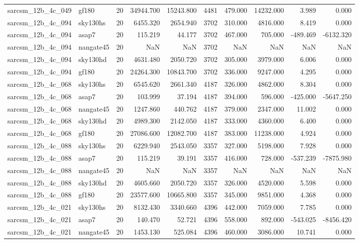\documentclass{article}
\begin{document}
\begin{longtable}{llrrrrrrrr}
sarcsm\_12b\_4c\_049 & gf180 & 20 & 34944.700 & 15243.800 & 4481 & 479.000 & 14232.000 & 3.989 & 0.000 \\
sarcsm\_12b\_4c\_094 & sky130hs & 20 & 6455.320 & 2654.940 & 3702 & 310.000 & 4816.000 & 8.419 & 0.000 \\
sarcsm\_12b\_4c\_094 & asap7 & 20 & 115.219 & 44.177 & 3702 & 467.000 & 705.000 & -489.469 & -6132.320 \\
sarcsm\_12b\_4c\_094 & nangate45 & 20 & NaN & NaN & 3702 & NaN & NaN & NaN & NaN \\
sarcsm\_12b\_4c\_094 & sky130hd & 20 & 4631.480 & 2050.720 & 3702 & 305.000 & 3979.000 & 6.006 & 0.000 \\
sarcsm\_12b\_4c\_094 & gf180 & 20 & 24264.300 & 10843.700 & 3702 & 336.000 & 9247.000 & 4.295 & 0.000 \\
sarcsm\_12b\_4c\_068 & sky130hs & 20 & 6545.620 & 2661.340 & 4187 & 326.000 & 4862.000 & 8.304 & 0.000 \\
sarcsm\_12b\_4c\_068 & asap7 & 20 & 103.999 & 37.194 & 4187 & 394.000 & 596.000 & -425.000 & -5647.250 \\
sarcsm\_12b\_4c\_068 & nangate45 & 20 & 1247.860 & 440.762 & 4187 & 379.000 & 2347.000 & 11.002 & 0.000 \\
sarcsm\_12b\_4c\_068 & sky130hd & 20 & 4989.300 & 2142.050 & 4187 & 333.000 & 4360.000 & 6.400 & 0.000 \\
sarcsm\_12b\_4c\_068 & gf180 & 20 & 27086.600 & 12082.700 & 4187 & 383.000 & 11238.000 & 4.924 & 0.000 \\
sarcsm\_12b\_4c\_088 & sky130hs & 20 & 6229.940 & 2543.050 & 3357 & 327.000 & 5198.000 & 7.928 & 0.000 \\
sarcsm\_12b\_4c\_088 & asap7 & 20 & 115.219 & 39.191 & 3357 & 416.000 & 728.000 & -537.239 & -7875.980 \\
sarcsm\_12b\_4c\_088 & nangate45 & 20 & NaN & NaN & 3357 & NaN & NaN & NaN & NaN \\
sarcsm\_12b\_4c\_088 & sky130hd & 20 & 4605.660 & 2050.720 & 3357 & 326.000 & 4520.000 & 5.598 & 0.000 \\
sarcsm\_12b\_4c\_088 & gf180 & 20 & 23577.600 & 10665.800 & 3357 & 345.000 & 9851.000 & 4.368 & 0.000 \\
sarcsm\_12b\_4c\_021 & sky130hs & 20 & 8132.430 & 3340.660 & 4396 & 442.000 & 7059.000 & 7.785 & 0.000 \\
sarcsm\_12b\_4c\_021 & asap7 & 20 & 140.470 & 52.721 & 4396 & 558.000 & 892.000 & -543.025 & -8456.420 \\
sarcsm\_12b\_4c\_021 & nangate45 & 20 & 1453.130 & 525.084 & 4396 & 460.000 & 3086.000 & 10.741 & 0.000 \\

\end{longtable}
\end{document}
